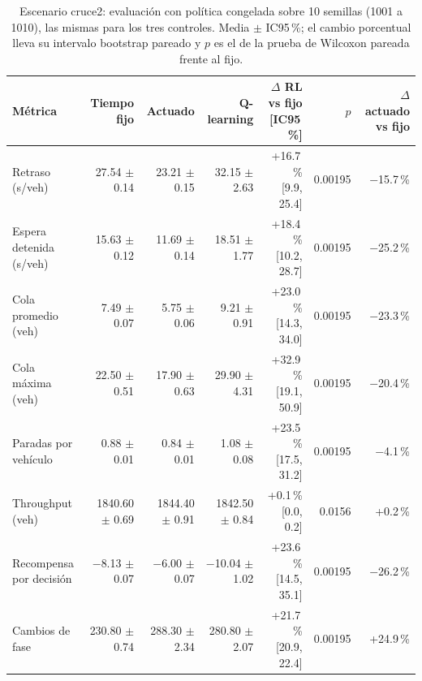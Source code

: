 \begin{table}[H]
\centering
\scriptsize
\setlength{\tabcolsep}{3pt}
\setlength{\tabcolsep}{2pt}
\begin{tabular}{lrrrrrr}
\toprule
Métrica & Tiempo fijo & Actuado & Q-learning & \makecell{$\Delta$ RL vs fijo\\{}[IC95\,\%]} & $p$ & \makecell{$\Delta$ actuado\\vs fijo} \\
\midrule
Retraso (s/veh) & 27.54 $\pm$ 0.14 & 23.21 $\pm$ 0.15 & 32.15 $\pm$ 2.63 & \makecell{+16.7\,\%\\{}[9.9, 25.4]} & 0.00195 & $-$15.7\,\% \\
Espera detenida (s/veh) & 15.63 $\pm$ 0.12 & 11.69 $\pm$ 0.14 & 18.51 $\pm$ 1.77 & \makecell{+18.4\,\%\\{}[10.2, 28.7]} & 0.00195 & $-$25.2\,\% \\
Cola promedio (veh) & 7.49 $\pm$ 0.07 & 5.75 $\pm$ 0.06 & 9.21 $\pm$ 0.91 & \makecell{+23.0\,\%\\{}[14.3, 34.0]} & 0.00195 & $-$23.3\,\% \\
Cola máxima (veh) & 22.50 $\pm$ 0.51 & 17.90 $\pm$ 0.63 & 29.90 $\pm$ 4.31 & \makecell{+32.9\,\%\\{}[19.1, 50.9]} & 0.00195 & $-$20.4\,\% \\
Paradas por vehículo & 0.88 $\pm$ 0.01 & 0.84 $\pm$ 0.01 & 1.08 $\pm$ 0.08 & \makecell{+23.5\,\%\\{}[17.5, 31.2]} & 0.00195 & $-$4.1\,\% \\
Throughput (veh) & 1840.60 $\pm$ 0.69 & 1844.40 $\pm$ 0.91 & 1842.50 $\pm$ 0.84 & \makecell{+0.1\,\%\\{}[0.0, 0.2]} & 0.0156 & +0.2\,\% \\
Recompensa por decisión & $-$8.13 $\pm$ 0.07 & $-$6.00 $\pm$ 0.07 & $-$10.04 $\pm$ 1.02 & \makecell{+23.6\,\%\\{}[14.5, 35.1]} & 0.00195 & $-$26.2\,\% \\
Cambios de fase & 230.80 $\pm$ 0.74 & 288.30 $\pm$ 2.34 & 280.80 $\pm$ 2.07 & \makecell{+21.7\,\%\\{}[20.9, 22.4]} & 0.00195 & +24.9\,\% \\
\bottomrule
\end{tabular}
\caption[Escenario cruce2: evaluación con política congelada]{Escenario cruce2: evaluación con política congelada sobre 10 semillas (1001 a 1010), las mismas para los tres controles. Media $\pm$ IC95\,\%; el cambio porcentual lleva su intervalo bootstrap pareado y $p$ es el de la prueba de Wilcoxon pareada frente al fijo.}
\label{tab:cruce2-evaluacion}
\end{table}
